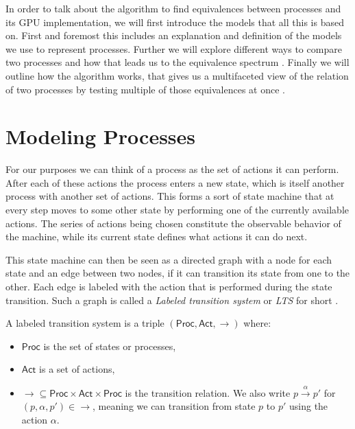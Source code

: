 In order to talk about the algorithm to find equivalences between processes
and its GPU implementation,
we will first introduce the models that all this is based on.
First and foremost this includes an explanation and definition
of the models we use to represent processes.
Further we will explore different ways to compare two processes
and how that leads us to the equivalence spectrum
\cite{glabbeek1990spectrum}.
Finally we will outline how the algorithm works,
that gives us a multifaceted view of the relation of two processes
by testing multiple of those equivalences at once
\cite{bisping2023process}.

\section{Modeling Processes}

For our purposes we can think of a process as the set of actions it can perform.
After each of these actions the process enters a new state,
which is itself another process with another set of actions.
This forms a sort of state machine that at every step
moves to some other state by performing one of the currently available actions.
The series of actions being chosen
constitute the observable behavior of the machine,
while its current state defines what actions it can do next.

This state machine can then be seen as a directed graph
with a node for each state and an edge between two nodes,
if it can transition its state from one to the other.
Each edge is labeled with the action that is performed during the state
transition.
Such a graph is called a \emph{Labeled transition system} or \emph{LTS} for
short
\cite{reactive_systems}.


\begin{definition}
    A labeled transition system is a triple
    $(\mathsf{Proc}, \mathsf{Act}, \rightarrow)$
    where:

    \begin{itemize}
        \item $\mathsf{Proc}$ is the set of states or processes,
        \item $\mathsf{Act}$ is a set of actions,
        \item $\rightarrow \subseteq \mathsf{Proc} \times \mathsf{Act} \times \mathsf{Proc}$
            is the transition relation.
            We also write
            $p \xrightarrow{\alpha} p'$ for $(p, \alpha, p') \in \rightarrow$,
            meaning we can transition from state $p$ to $p'$
            using the action $\alpha$.
    \end{itemize}
\end{definition}

